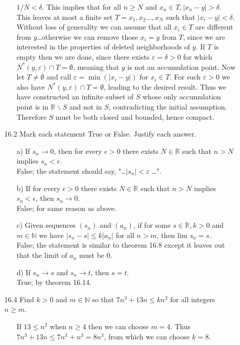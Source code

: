 \documentclass[12pt]{article}
\begin{document}
\begin{enumerate}
\begin{enumerate}
\begin{enumerate}
$1/N < \delta$. This
implies that for all $n \geq N$ and $x_n \in T, |x_n - y| > \delta$. This leaves at most a finite set
$T = {x_1, x_2..., x_N}$ such that $|x_i - y| < \delta$. Without loss of generality we can assume
that all $x_i \in T$ are different from $y$\ldots otherwise we can remove those $x_i = y$ from $T$,
since we are interested in the properties of deleted neighborhoods of $y$. If $T$ is empty
then we are done, since there exists $\varepsilon = \delta > 0$ for which 
$N^* (y, \varepsilon ) \cap T = \emptyset $, meaning that $y$ is not an accumulation point. 
Now let $T \neq \emptyset$ and call $\varepsilon = \min (|x_i - y|)$ for $x_i \in T$.
For such $\varepsilon > 0$ we also have $N^* (y, \varepsilon) \cap T = \emptyset$, 
leading to the desired result. Thus we
have constructed an infinite subset of $S$ whose only accumulation point is in 
$\mathbb{R}\backslash S$ and
not in $S$, contradicting the initial assumption. Therefore $S$ must be both closed and
bounded, hence compact.
\end{enumerate}

\item[16.2] Mark each statement True or False. Justify each answer.
\begin{enumerate}
\item[a)] If $s_n \rightarrow 0$, then for every $\epsilon > 0$ there exists $N \in \mathbb{R}$ such that $n > N$ implies $s_n < \epsilon$. \\
False; the statement should say, "\ldots $|s_n| < \varepsilon$ \ldots ".
\item[b)] If for every $\epsilon > 0$ there exists $N \in \mathbb{R}$ such that $n > N$ implies $s_n < \epsilon$, then $s_n \rightarrow 0$. \\
False; for same reason as above.
\item[c)] Given sequences $(s_n)$ and $(a_n)$, if for some $s \in \mathbb{R}, k > 0$ and $m \in \mathbb{N}$ we have $|s_n - s| \leq k|a_n|$ for all $n > m$, then lim $s_n = s$. \\
False; the statement is similar to theorem 16.8 except it
leaves out that the limit of $a_n$ must be $0$. 
\item[d)] If $s_n \rightarrow s$ and $s_n \rightarrow t$, then $s = t$. \\
True; by theorem 16.14.
\end{enumerate}

\item[16.4] Find $k > 0$ and $m \in \mathbb{N}$ so that $7n^3 + 13n \leq kn^3$ for all integers $n \geq m$.
\begin{enumerate}
\item[] If $13 \leq n^2$ when $n \geq 4$ then we can choose $m = 4$. Thus \\
$7n^3 + 13n \leq 7n^3 + n^3 = 8n^3$, from which we can choose $k = 8$.
\end{enumerate}


\end{enumerate}
\end{enumerate}
\end{document}
